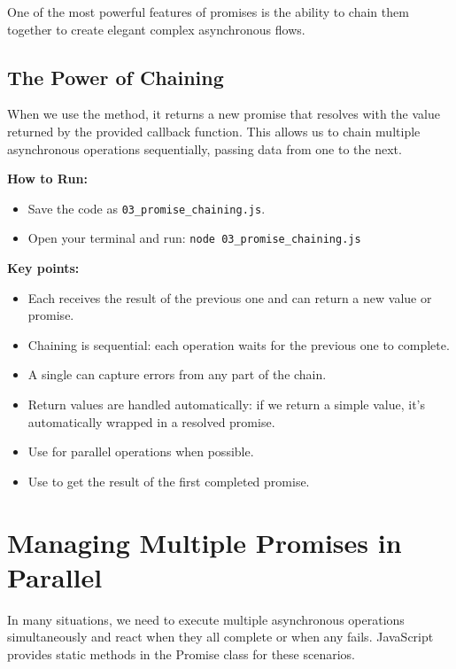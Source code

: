 One of the most powerful features of promises is the ability to chain them together to create elegant complex asynchronous flows.

\subsection{The Power of Chaining}

When we use the  method, it returns a new promise that resolves with the value returned by the provided callback function. This allows us to chain multiple asynchronous operations sequentially, passing data from one to the next.

\textbf{How to Run:}
\begin{itemize}
    \item Save the code as \verb|03_promise_chaining.js|.
    \item Open your terminal and run: \verb|node 03_promise_chaining.js|
\end{itemize}

\begin{macterminal}
  
\end{macterminal}

\textbf{Key points:}
\begin{itemize}
    \item Each  receives the result of the previous one and can return a new value or promise.
    \item Chaining is sequential: each operation waits for the previous one to complete.
    \item A single  can capture errors from any part of the chain.
    \item Return values are handled automatically: if we return a simple value, it's automatically wrapped in a resolved promise.
    \item Use  for parallel operations when possible.
    \item Use  to get the result of the first completed promise.
\end{itemize}

\section{Managing Multiple Promises in Parallel}

In many situations, we need to execute multiple asynchronous operations simultaneously and react when they all complete or when any fails. JavaScript provides static methods in the Promise class for these scenarios.


